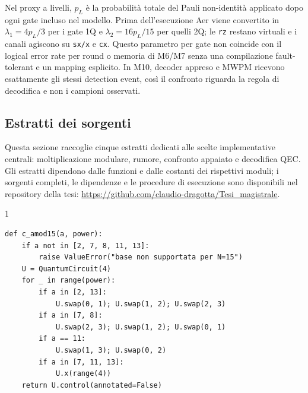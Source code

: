 \begin{onehalfspace}
Nel proxy a livelli, $p_L$ è la probabilità totale del Pauli non-identità applicato dopo
ogni gate incluso nel modello. Prima dell'esecuzione Aer viene convertito in
$\lambda_1=4p_L/3$ per i gate 1Q e $\lambda_2=16p_L/15$ per quelli 2Q; le \texttt{rz}
restano virtuali e i canali agiscono su \texttt{sx/x} e \texttt{cx}. Questo parametro
per gate non coincide con il logical error rate per round o memoria di M6/M7 senza una
compilazione fault-tolerant e un mapping esplicito. In M10, decoder appreso e
\ac{MWPM} ricevono esattamente gli stessi detection event, così il confronto riguarda la
regola di decodifica e non i campioni osservati.

\end{onehalfspace}

\subsection{Estratti dei sorgenti}
\label{app:estratti_sorgenti}

Questa sezione raccoglie cinque estratti dedicati alle scelte implementative centrali: moltiplicazione modulare, rumore, confronto appaiato e decodifica QEC. Gli estratti dipendono dalle funzioni e dalle costanti dei rispettivi moduli; i sorgenti completi, le dipendenze e le procedure di esecuzione sono disponibili nel repository della tesi:
\url{https://github.com/claudio-dragotta/Tesi_magistrale}.

\par\medskip\noindent
\begin{minipage}{\linewidth}
\begin{spacing}{1}
\begin{lstlisting}[caption={Moltiplicazione modulare N15 corretta: l'operazione $\times a$ viene ripetuta \texttt{power} volte}, label={lst:modular_exponentiation_per_n15}]
def c_amod15(a, power):
    if a not in [2, 7, 8, 11, 13]:
        raise ValueError("base non supportata per N=15")
    U = QuantumCircuit(4)
    for _ in range(power):
        if a in [2, 13]:
            U.swap(0, 1); U.swap(1, 2); U.swap(2, 3)
        if a in [7, 8]:
            U.swap(2, 3); U.swap(1, 2); U.swap(0, 1)
        if a == 11:
            U.swap(1, 3); U.swap(0, 2)
        if a in [7, 11, 13]:
            U.x(range(4))
    return U.control(annotated=False)
\end{lstlisting}
\end{spacing}
\end{minipage}


